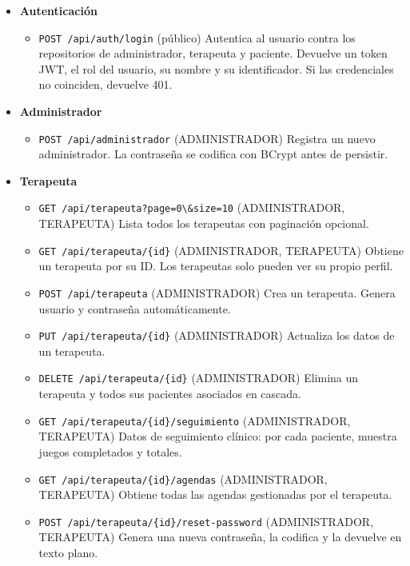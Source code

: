 \begin{itemize}
\item \textbf{Autenticación}
\begin{itemize}
\item \verb|POST /api/auth/login| (público) Autentica al usuario contra los repositorios de administrador, terapeuta y paciente. Devuelve un token JWT, el rol del usuario, su nombre y su identificador. Si las credenciales no coinciden, devuelve 401.
\end{itemize}

\item \textbf{Administrador}
\begin{itemize}
\item \verb|POST /api/administrador| (ADMINISTRADOR) Registra un nuevo administrador. La contraseña se codifica con BCrypt antes de persistir.
\end{itemize}

\item \textbf{Terapeuta}
\begin{itemize}
\item \verb|GET /api/terapeuta?page=0\&size=10| (ADMINISTRADOR, TERAPEUTA) Lista todos los terapeutas con paginación opcional.
\item \verb|GET /api/terapeuta/{id}| (ADMINISTRADOR, TERAPEUTA) Obtiene un terapeuta por su ID. Los terapeutas solo pueden ver su propio perfil.
\item \verb|POST /api/terapeuta| (ADMINISTRADOR) Crea un terapeuta. Genera usuario y contraseña automáticamente.
\item \verb|PUT /api/terapeuta/{id}| (ADMINISTRADOR) Actualiza los datos de un terapeuta.
\item \verb|DELETE /api/terapeuta/{id}| (ADMINISTRADOR) Elimina un terapeuta y todos sus pacientes asociados en cascada.
\item \verb|GET /api/terapeuta/{id}/seguimiento| (ADMINISTRADOR, TERAPEUTA) Datos de seguimiento clínico: por cada paciente, muestra juegos completados y totales.
\item \verb|GET /api/terapeuta/{id}/agendas| (ADMINISTRADOR, TERAPEUTA) Obtiene todas las agendas gestionadas por el terapeuta.
\item \verb|POST /api/terapeuta/{id}/reset-password| (ADMINISTRADOR, TERAPEUTA) Genera una nueva contraseña, la codifica y la devuelve en texto plano.
\end{itemize}


\end{itemize}
